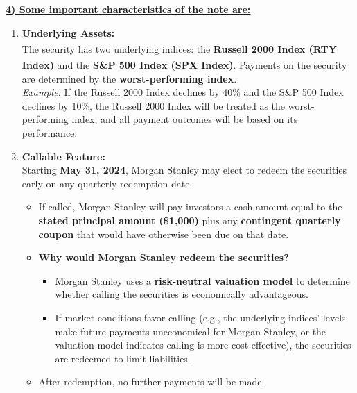 \documentclass[12pt,a4paper]{article}
\begin{document}
\vspace{0.5cm}


\underline{\textbf{4) Some important characteristics of the note are:}}
\begin{enumerate}[label=\textbf{\arabic*.}]
    \item \textbf{Underlying Assets:} \\
    The security has two underlying indices: the \textbf{Russell 2000\textsuperscript{\textregistered} Index (RTY Index)} and the \textbf{S\&P 500\textsuperscript{\textregistered} Index (SPX Index)}. Payments on the security are determined by the \textbf{worst-performing index}. \\
    \textit{Example:} If the Russell 2000 Index declines by 40\% and the S\&P 500 Index declines by 10\%, the Russell 2000 Index will be treated as the worst-performing index, and all payment outcomes will be based on its performance.

    \item \textbf{Callable Feature:} \\
    Starting \textbf{May 31, 2024}, Morgan Stanley may elect to redeem the securities early on any quarterly redemption date. 
    \begin{itemize}
        \item If called, Morgan Stanley will pay investors a cash amount equal to the \textbf{stated principal amount (\$1,000)} plus any \textbf{contingent quarterly coupon} that would have otherwise been due on that date.
        \item \textbf{Why would Morgan Stanley redeem the securities?}
        \begin{itemize}
            \item Morgan Stanley uses a \textbf{risk-neutral valuation model} to determine whether calling the securities is economically advantageous.
            \item If market conditions favor calling (e.g., the underlying indices' levels make future payments uneconomical for Morgan Stanley, or the valuation model indicates calling is more cost-effective), the securities are redeemed to limit liabilities.
        \end{itemize}
        \item After redemption, no further payments will be made.
    \end{itemize}


\end{enumerate}
\end{document}
